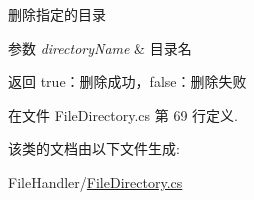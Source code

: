 删除指定的目录 


\begin{DoxyParams}{参数}
{\em directory\-Name} & 目录名\\
\hline
\end{DoxyParams}
\begin{DoxyReturn}{返回}
true：删除成功，false：删除失败
\end{DoxyReturn}


在文件 File\-Directory.\-cs 第 69 行定义.



该类的文档由以下文件生成\-:\begin{DoxyCompactItemize}
\item 
File\-Handler/\hyperlink{_file_directory_8cs}{File\-Directory.\-cs}\end{DoxyCompactItemize}
